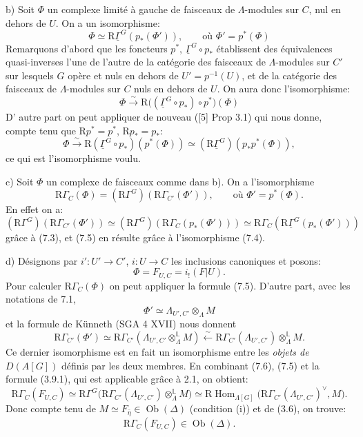 \documentclass[11pt]{article}
\DeclareMathOperator{\Hom}{Hom}
\providecommand{\Hom}{\operatorname{Hom}}
\providecommand{\Hom}{\operatorname{Hom}}
\begin{document}
b) Soit $\Phi$ un complexe limité à gauche de faisceaux de $\Lambda$-modules sur $C$, nul en dehors de $U$. On a un isomorphisme:
\[
\Phi\simeq \mathrm{R}\underline{\Gamma}^G(p_*(\Phi')),
\qquad\text{où } \Phi'=p^*(\Phi)
\tag{7.4}
\]
Remarquons d'abord que les foncteurs $p^*$, $\underline{\Gamma}^G\circ p_*$ établissent des équivalences quasi-inverses l'une de l'autre de la catégorie des faisceaux de $\Lambda$-modules sur $C'$ sur lesquels $G$ opère et nuls en dehors de $U'=p^{-1}(U)$, et de la catégorie des faisceaux de $\Lambda$-modules sur $C$ nuls en dehors de $U$. On aura donc l'isomorphisme:
\[
\Phi\xrightarrow{\sim} \mathrm{R}\bigl((\underline{\Gamma}^G\circ p_*)\circ p^*\bigr)(\Phi)
\]
D'%
autre part on peut appliquer de nouveau ([5] Prop 3.1) qui nous donne, compte tenu que $\mathrm{R} p^*=p^*$, $\mathrm{R} p_*=p_*$:
\[
\Phi\xrightarrow{\sim} \mathrm{R}(\underline{\Gamma}^G\circ p_*)(p^*(\Phi))
\simeq (\mathrm{R}\underline{\Gamma}^G)(p_*p^*(\Phi)),
\]
ce qui est l'isomorphisme voulu.

c) Soit $\Phi$ un complexe de faisceaux comme dans b). On a l'isomorphisme
\[
\mathrm{R}\Gamma_C(\Phi)=(\mathrm{R}\Gamma^G)(\mathrm{R}\Gamma_{C'}(\Phi')),
\qquad\text{où } \Phi'=p^*(\Phi).
\tag{7.5}
\]
En effet on a:
\[
(\mathrm{R}\Gamma^G)(\mathrm{R}\Gamma_{C'}(\Phi'))
\simeq
(\mathrm{R}\Gamma^G)(\mathrm{R}\Gamma_C(p_*(\Phi')))
\simeq
\mathrm{R}\Gamma_C(\mathrm{R}\underline{\Gamma}^G(p_*(\Phi')))
\]
grâce à (7.3), et (7.5) en résulte grâce à l'isomorphisme (7.4).

d) Désignons par $i':U'\to C'$, $i:U\to C$ les inclusions canoniques et posons:
\[
\Phi=F_{U,C}=i_!(F|U).
\]
Pour calculer $\mathrm{R}\Gamma_C(\Phi)$ on peut appliquer la formule (7.5). D'autre part, avec les notations de 7.1,
\[
\Phi'\simeq \Lambda_{U',C'}\otimes_\Lambda M
\]
et la formule de Künneth (SGA 4 XVII) nous donnent
\[
\mathrm{R}\Gamma_{C'}(\Phi')
\simeq
\mathrm{R}\Gamma_{C'}(\Lambda_{U',C'}\otimes_\Lambda^{\mathbb{L}} M)
\xleftarrow{\sim}
\mathrm{R}\Gamma_{C'}(\Lambda_{U',C'})\otimes_\Lambda^{\mathbb{L}} M.
\tag{7.6}
\]
Ce
dernier isomorphisme est en fait un isomorphisme entre les \emph{objets de} $D(A[G])$ définis par les deux membres. En combinant (7.6), (7.5) et la formule (3.9.1), qui est applicable grâce à 2.1, on obtient:
\[
\mathrm{R}\Gamma_C(F_{U,C})
\simeq
\mathrm{R}\Gamma^G\bigl(\mathrm{R}\Gamma_{C'}(\Lambda_{U',C'})\otimes_\Lambda^{\mathbb{L}} M\bigr)
\simeq
\mathrm{R}\Hom_{\Lambda[G]}\bigl(\mathrm{R}\Gamma_{C'}(\Lambda_{U',C'})^\vee,M\bigr).
\tag{7.7}
\]
Donc compte tenu de $M\simeq F_{\bar\eta}\in\operatorname{Ob}(\Delta)$ (condition (i)) et de (3.6), on trouve:
\[
\mathrm{R}\Gamma_C(F_{U,C})\in\operatorname{Ob}(\Delta).
\]
\end{document}
